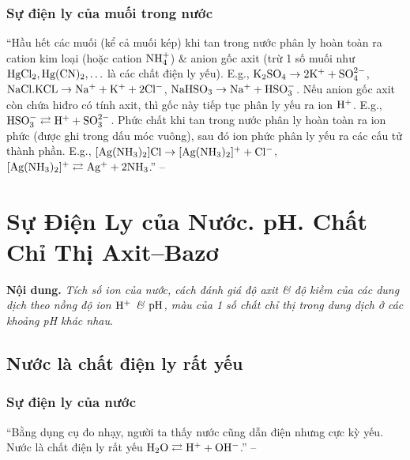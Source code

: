 \documentclass[oneside]{book}
\numberwithin{equation}{section}
\begin{document}
\subsubsection{Sự điện ly của muối trong nước}
``Hầu hết các muối (kể cả muối kép) khi tan trong nước phân ly hoàn toàn ra cation kim loại (hoặc cation $\rm NH_4^+$) \& anion gốc axit (trừ 1 số muối như $\rm HgCl_2,Hg(CN)_2,\ldots$ là các chất điện ly yếu). E.g., $\rm K_2SO_4\to 2K^+ + SO_4^{2-}$, $\rm NaCl.KCL\to Na^+ + K^+ + 2Cl^-$, $\rm NaHSO_3\to Na^+ + HSO_3^-$. Nếu anion gốc axit còn chứa hiđro có tính axit, thì gốc này tiếp tục phân ly yếu ra ion $\rm H^+$. E.g., $\rm HSO_3^-\rightleftarrows H^+ + SO_3^{2-}$. Phức chất khi tan trong nước phân ly hoàn toàn ra ion phức (được ghi trong dấu móc vuông), sau đó ion phức phân ly yếu ra các cấu tử thành phần. E.g., $\rm[Ag(NH_3)_2]Cl\to[Ag(NH_3)_2]^+ + Cl^-$, $\rm[Ag(NH_3)_2]^+\rightleftarrows Ag^+ + 2NH_3$.'' -- \cite[p. 15]{SGK_Hoa_Hoc_11_nang_cao}


\section{Sự Điện Ly của Nước. pH. Chất Chỉ Thị Axit--Bazơ}
\textbf{Nội dung.} \textit{Tích số ion của nước, cách đánh giá độ axit \& độ kiềm của các dung dịch theo nồng độ ion $\rm H^+$ \& $\rm pH$, màu của 1 số chất chỉ thị trong dung dịch ở các khoảng pH khác nhau}.

\subsection{Nước là chất điện ly rất yếu}

\subsubsection{Sự điện ly của nước}
``Bằng dụng cụ đo nhạy, người ta thấy nước cũng dẫn điện nhưng cực kỳ yếu. Nước là chất điện ly rất yếu $\rm H_2O\rightleftarrows H^+ + OH^-$.'' -- \cite[p. 17]{SGK_Hoa_Hoc_11_nang_cao}
\end{document}

